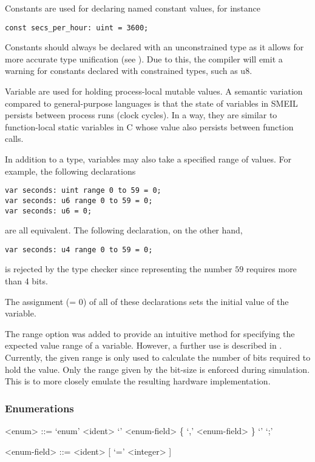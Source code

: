 \noindent Constants are used for declaring named constant values, for instance
\begin{lstlisting}[language=smeil]
const secs_per_hour: uint = 3600;
\end{lstlisting}
Constants should always be declared with an unconstrained type as it allows for
more accurate type unification (see ). Due to this, the
compiler will emit a warning for constants declared with constrained types, such
as {\ttfamily u8}.

Variable are used for holding process-local mutable values. A semantic variation
compared to general-purpose languages is that the state of variables in SMEIL
persists between process runs (clock cycles). In a way, they are similar to
function-local {\ttfamily static} variables in C whose value also persists
between function calls.

In addition to a type, variables may also take a specified {\ttfamily range} of
values. For example, the following declarations
\begin{lstlisting}[language=smeil]
var seconds: uint range 0 to 59 = 0;
var seconds: u6 range 0 to 59 = 0;
var seconds: u6 = 0;
\end{lstlisting}
are all equivalent. The following declaration, on the other hand,
\begin{lstlisting}[language=smeil]
var seconds: u4 range 0 to 59 = 0;
\end{lstlisting}
is rejected by the type checker since representing the number $59$ requires more
than 4 bits.

The assignment ({\ttfamily = 0}) of all of these declarations sets the initial
value of the variable.

The {\ttfamily range} option was added to provide an intuitive method for
specifying the expected value range of a variable. However, a further use is
described in . Currently, the given range is only used to
calculate the number of bits required to hold the value. Only the range given by
the bit-size is enforced during simulation. This is to more closely emulate the
resulting hardware implementation.

\subsubsection{Enumerations}
\begin{grammar}
<enum> ::= `enum' <ident> `{' <enum-field> \{ `,' <enum-field>  \} `}' `;'

<enum-field> ::= <ident> [ `=' <integer> ]
\end{grammar}

